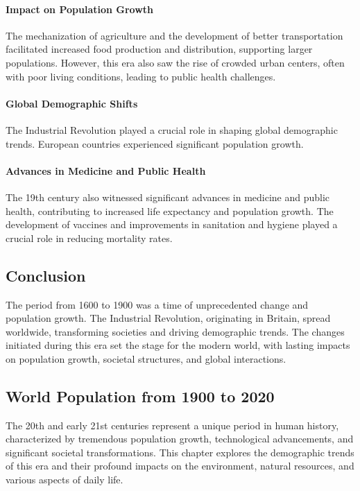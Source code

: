 \documentclass{book}
\begin{document}
\paragraph{Impact on Population Growth}
The mechanization of agriculture and the development of better transportation facilitated increased food production and distribution, supporting larger populations. However, this era also saw the rise of crowded urban centers, often with poor living conditions, leading to public health challenges.

\paragraph{Global Demographic Shifts}
The Industrial Revolution played a crucial role in shaping global demographic trends. European countries experienced significant population growth.

\paragraph{Advances in Medicine and Public Health}
The 19th century also witnessed significant advances in medicine and public health, contributing to increased life expectancy and population growth. The development of vaccines and improvements in sanitation and hygiene played a crucial role in reducing mortality rates.

\subsection*{Conclusion}
The period from 1600 to 1900 was a time of unprecedented change and population growth. The Industrial Revolution, originating in Britain, spread worldwide, transforming societies and driving demographic trends. The changes initiated during this era set the stage for the modern world, with lasting impacts on population growth, societal structures, and global interactions.

\subsection*{World Population from 1900 to 2020}
The 20th and early 21st centuries represent a unique period in human history, characterized by tremendous population growth, technological advancements, and significant societal transformations. This chapter explores the demographic trends of this era and their profound impacts on the environment, natural resources, and various aspects of daily life.
\end{document}
